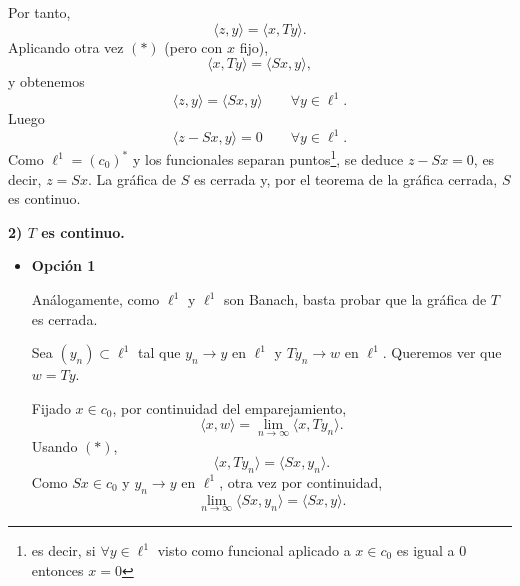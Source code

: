 \documentclass[12pt]{article}
\begin{document}
\begin{ejercicio}[2 puntos]
\begin{description}
            Por tanto,
            \begin{equation*}
            \langle z,y\rangle=\langle x,Ty\rangle.
            \end{equation*}
            Aplicando otra vez $(\ast)$ (pero con $x$ fijo),
            \begin{equation*}
            \langle x,Ty\rangle=\langle Sx,y\rangle,
            \end{equation*}
            y obtenemos
            \begin{equation*}
            \langle z,y\rangle=\langle Sx,y\rangle \qquad \forall y\in \ell^1.
            \end{equation*}
            Luego
            \begin{equation*}
            \langle z-Sx,y\rangle=0 \qquad \forall y\in \ell^1.
            \end{equation*}
            Como $\ell^1=(c_0)^\ast$ y los funcionales separan puntos\footnote{es decir, si $\forall y \in \ell^1$ visto como funcional aplicado a $x \in c_0$ es igual a $0$ entonces $x=0$}, se deduce $z-Sx=0$, es decir,
            $z=Sx$. La gráfica de $S$ es cerrada y, por el teorema de la gráfica cerrada, $S$ es continuo.
            
            \newpage
            
            \textbf{2) $T$ es continuo.}

            \begin{itemize}
                \item \textbf{Opción 1}
            
                Análogamente, como $\ell^1$ y $\ell^1$ son Banach, basta probar que la gráfica de $T$ es cerrada.
                
                Sea $(y_n)\subset \ell^1$ tal que $y_n\to y$ en $\ell^1$ y $Ty_n\to w$ en $\ell^1$.
                Queremos ver que $w=Ty$.
                
                Fijado $x\in c_0$, por continuidad del emparejamiento,
                \begin{equation*}
                \langle x,w\rangle=\lim_{n\to\infty}\langle x,Ty_n\rangle.
                \end{equation*}
                Usando $(\ast)$,
                \begin{equation*}
                \langle x,Ty_n\rangle=\langle Sx,y_n\rangle.
                \end{equation*}
                Como $Sx\in c_0$ y $y_n\to y$ en $\ell^1$, otra vez por continuidad,
                \begin{equation*}
                \lim_{n\to\infty}\langle Sx,y_n\rangle=\langle Sx,y\rangle.
                \end{equation*}


\end{itemize}
\end{description}
\end{ejercicio}
\end{document}
